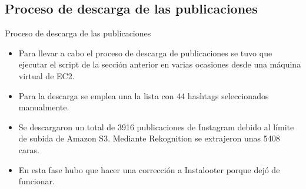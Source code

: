 \documentclass[aspectratio=149]{beamer}
\begin{document}
\subsection{Proceso de descarga de las publicaciones}
\begin{frame}[label=descarga]{Proceso de descarga de las publicaciones}
    \begin{itemize}
        \item Para llevar a cabo el proceso de descarga de publicaciones se tuvo que ejecutar el script de la sección anterior en varias ocasiones desde una máquina virtual de EC2.
        \item Para la descarga se emplea una la lista con 44 hashtags seleccionados manualmente.
        \item Se descargaron un total de 3916 publicaciones de Instagram debido al límite de subida de Amazon S3. Mediante Rekognition se extrajeron unas 5408 caras.
        \item En esta fase hubo que hacer una corrección a Instalooter porque dejó de funcionar.
    \end{itemize}
\end{frame}
\end{document}
